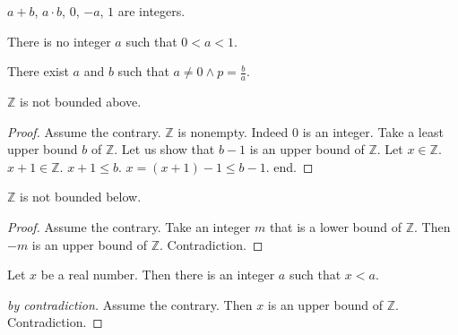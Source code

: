 \documentclass{article}
\begin{document}
\begin{forthel}

\begin{axiom} $a + b$, $a \cdot b$, $0$, $-a$, $1$ are integers.
\end{axiom}


\begin{axiom} There is no integer $a$ such that $0 < a < 1$.
\end{axiom}

\begin{axiom} There exist $a$ and $b$ such that 
$a \neq 0 \wedge p = \frac{b}{a}$.
\end{axiom}

\begin{theorem}[Archimedes1] $\mathbb{Z}$ is not bounded above.
\end{theorem}
\begin{proof} Assume the contrary.
$\mathbb{Z}$ is nonempty. Indeed $0$ is an integer.
Take a least upper bound 
$b$ of $\mathbb{Z}$.
Let us show that $b - 1$ is an upper bound of $\mathbb{Z}$.
Let $x \in \mathbb{Z}$. $x + 1 \in \mathbb{Z}$. 
$x + 1 \leq b$.
$x = (x + 1) - 1 \leq b - 1$.
end.
\end{proof}

\begin{theorem} $\mathbb{Z}$ is not bounded below.
\end{theorem}
\begin{proof}
Assume the contrary.
Take an integer $m$ that is a lower bound of $\mathbb{Z}$.
Then $-m$ is an upper bound of $\mathbb{Z}$. Contradiction.
\end{proof} 


\begin{theorem}[Archimedes2] Let $x$ be a real number.
Then there is an integer $a$ 
such that $x < a$.\end{theorem}
\begin{proof}[by contradiction]
Assume the contrary.
Then
$x$ is an upper bound of $\mathbb{Z}$.
Contradiction.
\end{proof}


\end{forthel}
\end{document}
